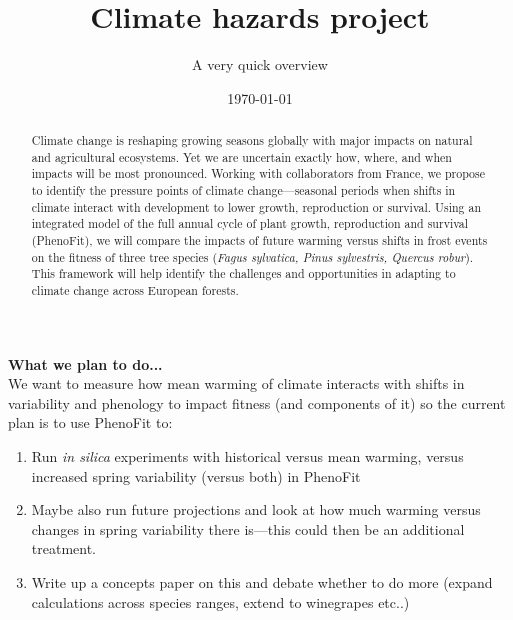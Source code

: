 \documentclass[11pt,letter]{article}
\begin{document}

\renewcommand{\refname}{\CHead{}}
\title{Climate hazards project}
\author{A very quick overview}
\date{\today}
\maketitle

\begin{abstract}
Climate change is reshaping growing seasons globally with major impacts on natural and agricultural ecosystems. Yet we are uncertain exactly how, where, and when impacts will be most pronounced. Working with collaborators from France, we propose  to identify the pressure points of climate change---seasonal periods when shifts in climate interact with development to lower growth, reproduction or survival. Using an integrated model of the full annual cycle of plant growth, reproduction and survival (PhenoFit), we will compare the impacts of future warming versus shifts in frost events on the fitness of three tree species (\emph{Fagus sylvatica, Pinus sylvestris, Quercus robur}). This framework will help identify the challenges and opportunities in adapting to climate change across European forests. 
\end{abstract}

{\bf What we plan to do...}\\

We want to measure how mean warming of climate interacts with shifts in variability and phenology to impact fitness (and components of it) so the current plan is to use PhenoFit to:
\begin{enumerate}
\item Run \emph{in silica} experiments with historical versus mean warming, versus increased spring variability (versus both) in PhenoFit
\item Maybe also run future projections and look at how much warming versus changes in spring variability there is---this could then be an additional treatment. 
\item Write up a concepts paper on this and debate whether to do more (expand calculations across species ranges, extend to winegrapes etc..)
\end{enumerate}
\end{document}
